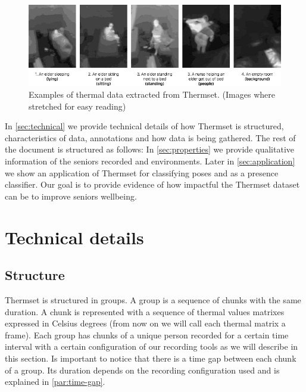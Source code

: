 \documentclass[oneside, twocolumn]{article}
\begin{document}
\begin{figure}
  \centering
    \includegraphics[width=1.0\textwidth]{images/examples}
  \caption{Examples of thermal data extracted from Thermset. (Images where stretched for easy reading)}
  \label{fig:examples}
\end{figure}



In \autoref{sec:technical} we provide technical details of how Thermset is structured, characteristics of data, annotations and how data is being gathered. The rest of the document is structured as follows: In \autoref{sec:properties} we provide qualitative information of the seniors recorded and environments. Later in \autoref{sec:application} we show an application of Thermset for classifying poses and as a presence classifier. Our goal is to provide evidence of how impactful the Thermset dataset can be to improve seniors wellbeing.


\section{Technical details}
\label{sec:technical}
\subsection{Structure}
Thermset is structured in groups. A group is a sequence of chunks with the same duration.
A chunk is represented with a sequence of thermal values matrixes expressed in Celsius degrees
(from now on we will call each thermal matrix a frame). Each group has chunks of a unique person
recorded for a certain time interval with a certain configuration of our recording tools as we will
describe in this section. Is important to notice that there is a time gap between each chunk of a
group. Its duration depends on the recording configuration used and is explained in \autoref{par:time-gap}.
\end{document}
